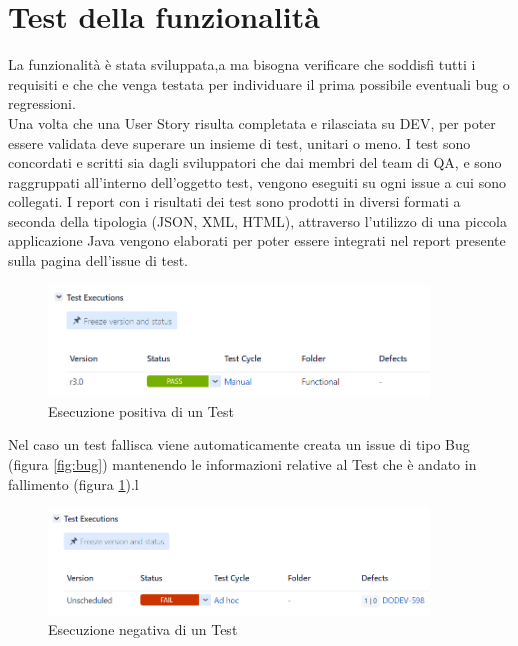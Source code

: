 \documentclass[a4paper, 12pt]{report}
\numberwithin{equation}{section}
\begin{document}
\section{Test della funzionalità}
La funzionalità è stata sviluppata,a ma bisogna verificare che soddisfi tutti i requisiti e che che venga testata per individuare il prima possibile eventuali bug o regressioni.\\
Una volta che una User Story risulta completata e rilasciata su DEV, per poter essere validata deve superare un insieme di test, unitari o meno. I test sono concordati e scritti sia dagli sviluppatori che dai membri del team di QA, e sono raggruppati all’interno dell’oggetto test, vengono eseguiti su ogni issue a cui sono collegati. I report con i risultati dei test sono prodotti in diversi formati a seconda della tipologia (JSON, XML, HTML), attraverso l’utilizzo di una piccola applicazione Java vengono elaborati per poter essere integrati nel report presente sulla pagina dell’issue di test.\\
\begin{figure}
    \centering
    \includegraphics[width=0.9\textwidth]{imgs/test-ok.png}
    \caption{Esecuzione positiva di un Test}
    \label{fig:test-ko}
\end{figure}
Nel caso un test fallisca viene automaticamente creata un issue di tipo Bug (figura \ref{fig:bug}) mantenendo le informazioni relative al Test che è andato in fallimento (figura \ref{fig:test-ko}).l\\
\begin{figure}
    \centering
    \includegraphics[width=0.9\textwidth]{imgs/test-ko.png}
    \caption{Esecuzione negativa di un Test}
    \label{fig:test-ok}
\end{figure}
\end{document}
